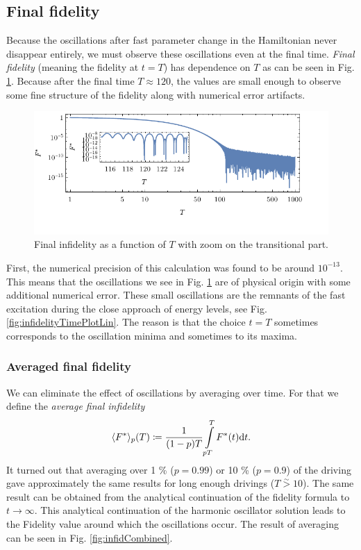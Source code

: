 \subsection{Final fidelity}
Because the oscillations after fast parameter change in the Hamiltonian never disappear entirely, we must observe these oscillations even at the final time. \emph{Final fidelity} (meaning the fidelity at $t=T$) has dependence on $T$ as can be seen in Fig. \ref{fig:infidelityTfPlotLogLinCombined}. Because after the final time $T\approx 120$, the values are small enough to observe some fine structure of the fidelity along with numerical error artifacts.
\begin{figure}[H]
    \centering
    \includegraphics[scale=1.2]{../img/infidelityTfPlotLogLinCombined1.pdf}
    \caption{Final infidelity as a function of $T$ with zoom on the transitional part.}
    \label{fig:infidelityTfPlotLogLinCombined}
\end{figure}

First, the numerical precision of this calculation was found to be around $10^{-13}$. This means that the oscillations we see in Fig. \ref{fig:infidelityTfPlotLogLinCombined} are of physical origin with some additional numerical error. These small oscillations are the remnants of the fast excitation during the close approach of energy levels, see Fig. \ref{fig:infidelityTimePlotLin}. The reason is that the choice $t=T$ sometimes corresponds to the oscillation minima and sometimes to its maxima.



\subsubsection{Averaged final fidelity}
We can eliminate the effect of oscillations by averaging over time. For that we define the \emph{average final infidelity}
\begin{equation}
    \langle F^*\rangle_p(T) \coloneqq \frac{1}{(1-p) T}\int\limits_{p T}^{T} F^*(t)\mathrm{d} t.
\end{equation}
It turned out that averaging over 1 \% ($p=0.99$) or 10 \% ($p=0.9$) of the driving gave approximately the same results for long enough drivings ($T\overset{\sim}{>} 10$). The same result can be obtained from the analytical continuation of the fidelity formula to $t\rightarrow  \infty$. This analytical continuation of the harmonic oscillator solution leads to the Fidelity value around which the oscillations occur. The result of averaging can be seen in Fig. \ref{fig:infidCombined}.

